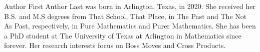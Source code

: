 
{Author First Author Last} was born in Arlington, Texas, in 2020. She received
her B.S. and M.S degrees from That School, That Place, 
in The Past and The Not As Past, respectively, in Pure Mathematics and Purer Mathematics. She has been a PhD student at The University of Texas at Arlington in Mathematics since forever. Her research interests focus on Boss Moves and Cross Products.
